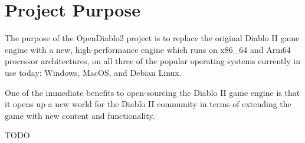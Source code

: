 \section{Project Purpose} \label{sec:projectpurpose}


The purpose of the OpenDiablo2 project is to replace the original Diablo II
game engine with a new, high-performance engine which runs on x86\_64 and Arm64
processor architectures, on all three of the popular operating systems currently
in use today: Windows, MacOS, and Debian Linux.

One of the immediate benefits to open-sourcing the Diablo II game engine is that
it opens up a new world for the Diablo II community in terms of extending the
game with new content and functionality.

TODO
